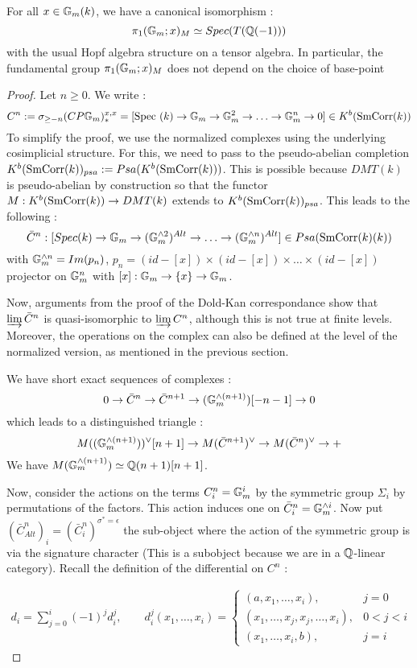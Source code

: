 \begin{prop}
For all $x\in\mathbb{G}_m(k)$, we have a canonical isomorphism :
\[
\pi_1(\mathbb{G}_m;x)_M\simeq Spec(T(\mathbb{Q}(-1)))
\]
with the usual Hopf algebra structure on a tensor algebra. In particular, the fundamental group $\pi_1(\mathbb{G}_m;x)_M$ does not depend on the choice of base-point
\end{prop}
\begin{proof}
Let $n\geq 0$. We write :
\[
C^n:=\sigma_{\geq -n}(CP\mathbb{G}_m)_*^{x,x}=[\mathrm{Spec}~(k)\rightarrow 
\mathbb{G}_m\rightarrow\mathbb{G}_m^2\rightarrow\ldots\rightarrow\mathbb{G}_m^n\rightarrow 0]\in 
K^b(\mathrm{SmCorr}(k))
\]
To simplify the proof, we use the normalized complexes using the underlying cosimplicial structure. For this, we need to pass to the pseudo-abelian completion $K^b(\mathrm{SmCorr}(k))_{psa}:=Psa(K^b(\mathrm{SmCorr}(k)))$. This is possible because $DMT(k)$ is pseudo-abelian by construction so that the functor $M:K^b(\mathrm{SmCorr}(k))\rightarrow DMT(k)$ extends to $K^b(\mathrm{SmCorr}(k))_{psa}$. This leads to the following :
\[
\bar{C}^n: [Spec(k)\rightarrow \mathbb{G}_m\rightarrow (\mathbb{G}_m^{\wedge 2})^{Alt}\rightarrow\ldots\rightarrow (\mathbb{G}_m^{\wedge n})^{Alt}]\in Psa(\mathrm{SmCorr}(k)(k))
\]
with $\mathbb{G}_m^{\wedge n}=Im(p_n)$, $p_n=(id-[x])\times (id-[x])\times\ldots \times (id-[x])$ projector on $\mathbb{G}_m^n$ with $[x]:\mathbb{G}_m\rightarrow \{x\}\rightarrow \mathbb{G}_m$.

Now, arguments from the proof of the Dold-Kan correspondance show that $\varinjlim \bar{C}^n$ is quasi-isomorphic to $\varinjlim C^n$, although this is not true at finite levels. Moreover, the operations on the complex can also be defined at the level of the normalized version, as mentioned in the previous section. 

 We have short exact sequences of complexes :
\[
0\rightarrow \bar{C}^{n}\rightarrow \bar{C}^{n+1}\rightarrow (\mathbb{G}_m^{\wedge (n+1)})[-n-1]\rightarrow 0
\]
which leads to a distinguished triangle :
\[
M((\mathbb{G}_m^{\wedge (n+1)}))^\vee[n+1]\rightarrow M(\bar{C}^{n+1})^{\vee}\rightarrow M(\bar{C}^n)^{\vee}\rightarrow +
\]
We have $M(\mathbb{G}_m^{\wedge (n+1)})\simeq \mathbb{Q}(n+1)[n+1]$.

Now, consider the actions on the terms $C^n_i=\mathbb{G}_m^i$ by the symmetric group $\Sigma_i$ by permutations of the factors. This action induces one on $\bar{C}^n_i=\mathbb{G}_m^{\wedge i}$. Now put $(\bar{C}^n_{Alt})_i=(\bar{C}^n_i)^{\sigma^*=\epsilon}$ the sub-object where the action of the symmetric group is via the signature character (This is a subobject because we are in a $\mathbb{Q}$-linear category). Recall the definition of the differential on $C^n$ :

\begin{eqnarray*}
d_i = \sum_{j=0}^{i} (-1)^j d_i^j, \qquad d_i^j(x_1, \ldots, x_i) = \left\{ \begin{array}{ll}
(a,x_1, \ldots, x_i), & j=0 \\
(x_1, \ldots, x_j, x_j, \ldots, x_i), & 0 < j < i \\
(x_1, \ldots, x_i, b), & j=i
\end{array} \right.
\end{eqnarray*}


\end{proof}
